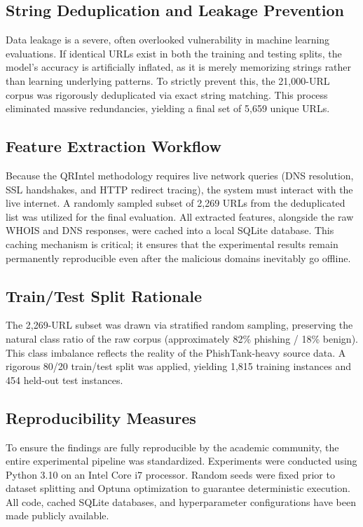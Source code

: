 \documentclass[10pt,twocolumn,letterpaper]{article}
\begin{document}
\subsection{String Deduplication and Leakage Prevention}
Data leakage is a severe, often overlooked vulnerability in machine learning evaluations. If identical URLs exist in both the training and testing splits, the model's accuracy is artificially inflated, as it is merely memorizing strings rather than learning underlying patterns. To strictly prevent this, the 21,000-URL corpus was rigorously deduplicated via exact string matching. This process eliminated massive redundancies, yielding a final set of 5,659 unique URLs. 

\subsection{Feature Extraction Workflow}
Because the QRIntel methodology requires live network queries (DNS resolution, SSL handshakes, and HTTP redirect tracing), the system must interact with the live internet. A randomly sampled subset of 2,269 URLs from the deduplicated list was utilized for the final evaluation. All extracted features, alongside the raw WHOIS and DNS responses, were cached into a local SQLite database. This caching mechanism is critical; it ensures that the experimental results remain permanently reproducible even after the malicious domains inevitably go offline.

\subsection{Train/Test Split Rationale}
The 2,269-URL subset was drawn via stratified random sampling, preserving the natural class ratio of the raw corpus (approximately 82\% phishing / 18\% benign). This class imbalance reflects the reality of the PhishTank-heavy source data. A rigorous 80/20 train/test split was applied, yielding 1,815 training instances and 454 held-out test instances. 

\subsection{Reproducibility Measures}
To ensure the findings are fully reproducible by the academic community, the entire experimental pipeline was standardized. Experiments were conducted using Python 3.10 on an Intel Core i7 processor. Random seeds were fixed prior to dataset splitting and Optuna optimization to guarantee deterministic execution. All code, cached SQLite databases, and hyperparameter configurations have been made publicly available.
\end{document}
